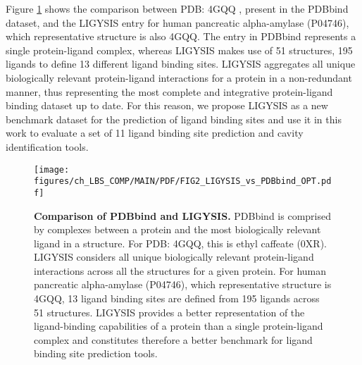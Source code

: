 \FloatBarrier


Figure \ref{fig:PDBbind_VS_LIGYSIS} shows the comparison between PDB: 4GQQ \cite{WILLIAMS_2012_AMYLASE}, present in the PDBbind dataset, and the LIGYSIS entry for human pancreatic alpha-amylase (P04746), which representative structure is also 4GQQ. The entry in PDBbind represents a single protein-ligand complex, whereas LIGYSIS makes use of 51 structures, 195 ligands to define 13 different ligand binding sites. LIGYSIS aggregates all unique biologically relevant protein-ligand interactions for a protein in a non-redundant manner, thus representing the most complete and integrative protein-ligand binding dataset up to date. For this reason, we propose LIGYSIS as a new benchmark dataset for the prediction of ligand binding sites and use it in this work to evaluate a set of 11 ligand binding site prediction and cavity identification tools.

\begin{figure}[htb!]
    \centering
    \texttt{[image: figures/ch\_LBS\_COMP/MAIN/PDF/FIG2\_LIGYSIS\_vs\_PDBbind\_OPT.pdf]}
    \caption[Comparison of PDBbind and LIGYSIS]{\textbf{Comparison of PDBbind and LIGYSIS.} PDBbind is comprised by complexes between a protein and the most biologically relevant ligand in a structure. For PDB: 4GQQ, this is ethyl caffeate (0XR). LIGYSIS considers all unique biologically relevant protein-ligand interactions across all the structures for a given protein. For human pancreatic alpha-amylase (P04746), which representative structure is 4GQQ, 13 ligand binding sites are defined from 195 ligands across 51 structures. LIGYSIS provides a better representation of the ligand-binding capabilities of a protein than a single protein-ligand complex and constitutes therefore a better benchmark for ligand binding site prediction tools.}
    \label{fig:PDBbind_VS_LIGYSIS}
\end{figure}

